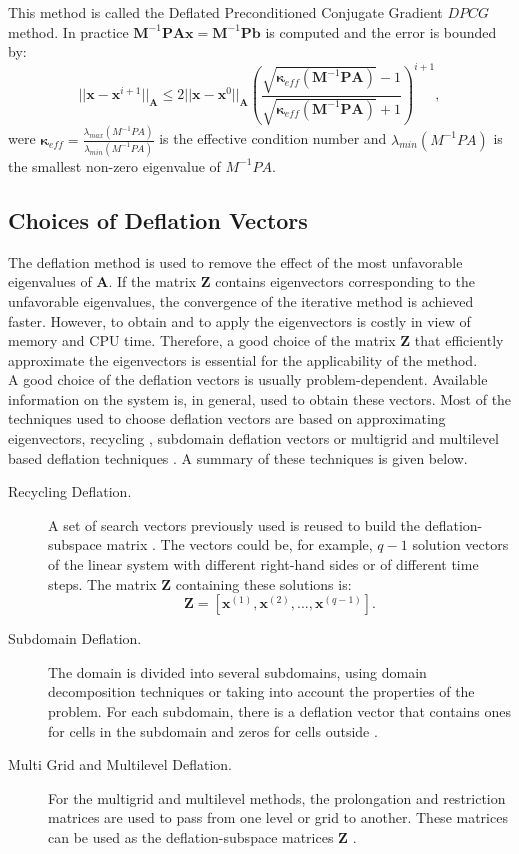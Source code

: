 \documentclass[12pt]{article}
\numberwithin{equation}{section}
\begin{document}
This method is called the Deflated Preconditioned Conjugate Gradient $DPCG$ method.
In practice $\mathbf{M}^{-1}\mathbf{P}\mathbf{A}\mathbf{x}=\mathbf{M}^{-1}\mathbf{P}\mathbf{b}$ is computed and the error is bounded by:
\begin{equation*}
 ||\mathbf{x}-\mathbf{x}^{i+1}||_\mathbf{A}\leq 2||\mathbf{x}-\mathbf{x}^{0}||_\mathbf{A} \left( \frac{\sqrt{\mathbf{\kappa}_{eff}(\mathbf{M}^{-1}\mathbf{P}\mathbf{A})}-1}{\sqrt{\mathbf{\kappa}_{eff}(\mathbf{M}^{-1}\mathbf{P}\mathbf{A})}+1} \right)^{i+1},
\end{equation*}
were $\mathbf{\kappa}_{eff}=\frac{\lambda_{max}(M^{-1}PA)}{\lambda_{min}(M^{-1}PA)}$ is the effective condition 
number and $\lambda_{min}(M^{-1}PA)$ is the smallest non-zero eigenvalue of $M^{-1}PA$.

\subsection{Choices of Deflation Vectors}
\hspace{0.5cm}The deflation method is used to remove the effect of the most unfavorable eigenvalues
of $\mathbf{A}$. If the matrix $\mathbf{Z}$ contains eigenvectors corresponding to the unfavorable 
eigenvalues, the convergence of the 
iterative method is achieved faster. However, to obtain and to apply the eigenvectors is costly in view of memory and CPU time.
Therefore, a good choice of the matrix $\mathbf{Z}$ that efficiently approximate the eigenvectors is essential
for the applicability of the method.\\
A good choice of the deflation vectors is usually problem-dependent. Available information on the system is, in general,
used to obtain these vectors.
Most of the techniques used to choose deflation vectors are based on approximating eigenvectors, 
recycling \cite{Clemens04}, subdomain deflation vectors \cite{Vuik02} or multigrid and 
multilevel based deflation techniques \cite{Tang09,Smith96}. A summary of these techniques is given below.
\begin{description}
 \item [Recycling Deflation.] A set of search vectors previously used is reused to build the deflation-subspace 
 matrix \cite{Clemens04}. 
The vectors could be, for example, $q-1$
solution vectors of the linear system with different right-hand sides or of different time steps.
The matrix $\mathbf{Z}$ containing these solutions is:
$$\mathbf{Z}=[\mathbf{x}^{(1)},\mathbf{x}^{(2)},...,\mathbf{x}^{(q-1)}].$$
 \item [Subdomain Deflation.] The domain is divided into several subdomains,
 using domain decomposition techniques or taking into account the properties of the problem.
For each subdomain, there is a deflation vector that contains ones for cells in the 
subdomain and zeros for cells outside \cite{Vuik02}.
 \item [Multi Grid and Multilevel Deflation.] For the multigrid and multilevel methods, 
 the prolongation and restriction matrices are used to pass from one level or grid to another. 
These matrices can be used as the deflation-subspace matrices $\mathbf{Z}$ \cite{Tang09}.
\end{description}
\newpage
\end{document}
